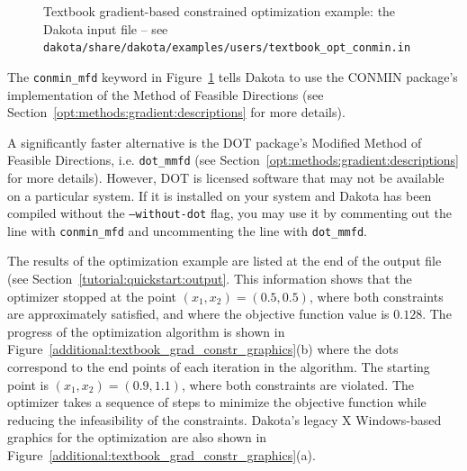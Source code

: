 \begin{figure}[ht!]
  \centering
  \begin{bigbox}
    \begin{small}
    \end{small}
  \end{bigbox}
  \caption{Textbook gradient-based constrained optimization example:
    the Dakota input file --
see \texttt{dakota/share/dakota/examples/users/textbook\_opt\_conmin.in} }
  \label{additional:textbook_grad_constr}
\end{figure}

The \texttt{conmin\_mfd} keyword in
Figure~\ref{additional:textbook_grad_constr} tells Dakota to use the
CONMIN package's implementation of the Method of Feasible Directions
(see Section~\ref{opt:methods:gradient:descriptions} for more
details).

A significantly faster alternative is the DOT package's Modified
Method of Feasible Directions, i.e. \texttt{dot\_mmfd} (see
Section~\ref{opt:methods:gradient:descriptions} for more
details). However, DOT is licensed software that may not be available
on a particular system. If it is installed on your system and Dakota
has been compiled without the \texttt{--without-dot} flag, you may use
it by commenting out the line with \texttt{conmin\_mfd} and
uncommenting the line with \texttt{dot\_mmfd}.

The results of the optimization example are listed at the end of
the output file (see Section~\ref{tutorial:quickstart:output}.
This information shows that the
optimizer stopped at the point $(x_1,x_2) = (0.5,0.5)$, where both
constraints are approximately satisfied, and where the objective function value is
$0.128$. The progress of the optimization algorithm is shown in
Figure~\ref{additional:textbook_grad_constr_graphics}(b) where the
dots correspond to the end points of each iteration in the algorithm. The
starting point is $(x_1,x_2) = (0.9,1.1)$, where both constraints
are violated. The optimizer takes a
sequence of steps to minimize the objective function while reducing
the infeasibility of the constraints.
Dakota's legacy X Windows-based graphics for the optimization are also
shown in Figure~\ref{additional:textbook_grad_constr_graphics}(a).

